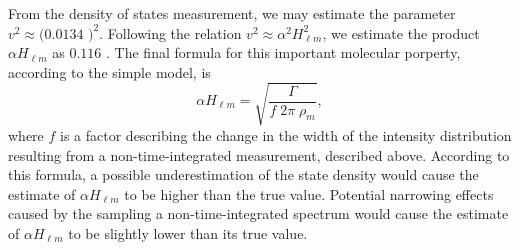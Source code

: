 \documentclass[12pt]{mitthesis}
\begin{document}
From the density of states measurement, we may estimate the parameter
$v^2 \approx (0.0134$ \rcm$)^2$.  Following the relation $v^2 \approx
\alpha^2 H_{\ell m}^2$, we estimate the product $\alpha H_{\ell m}$ as
$0.116$ \rcm.  The final formula for this important molecular
porperty, according to the simple model, is
\begin{equation}
  \alpha H_{\ell m} = \sqrt{\frac{\Gamma}{f \; 2 \pi \; \rho_m}},
\end{equation}
where $f$ is a factor describing the change in the width of the
intensity distribution resulting from a non-time-integrated
measurement, described above.  According to this formula, a possible
underestimation of the state density would cause the estimate of
$\alpha H_{\ell m}$ to be higher than the true value.  Potential
narrowing effects caused by the sampling a non-time-integrated
spectrum would cause the estimate of $\alpha H_{\ell m}$ to be
slightly lower than its true value.



\end{document}
